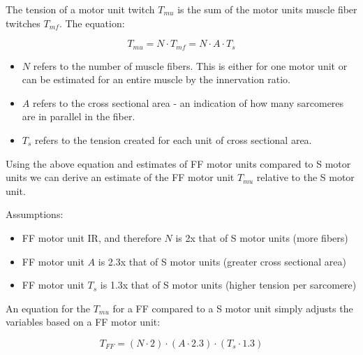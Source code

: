\vspace{0.2cm}

The tension of a motor unit twitch $T_{mu}$ is the sum of the motor units muscle fiber twitches $T_{mf}$. The equation:

\begin{equation}
    T_{mu} = N \cdot T_{mf} = N \cdot A \cdot T_s
\end{equation}

\begin{itemize}
    \item $N$ refers to the number of muscle fibers. This is either for one motor unit or can be estimated for an entire muscle by the innervation ratio.\footnotemark{}
    \item $A$ refers to the cross sectional area - an indication of how many sarcomeres are in parallel in the fiber.
    \item $T_s$ refers to the tension created for each unit of cross sectional area.
\end{itemize}

Using the above equation and estimates of FF motor units compared to S motor units we can derive an estimate of the FF motor unit $T_{mu}$ relative to the S motor unit. 

\vspace{0.2cm}
Assumptions:
\begin{itemize}
    \item FF motor unit IR, and therefore $N$ is 2x that of S motor units (more fibers)
    \item FF motor unit $A$ is 2.3x that of S motor units (greater cross sectional area)
    \item FF motor unit $T_s$ is 1.3x that of S motor units (higher tension per sarcomere)
\end{itemize}

An equation for the $T_{mu}$ for a FF compared to a S motor unit simply adjusts the variables based on a FF motor unit:

\begin{equation}
    T_{FF} = (N \cdot 2) \cdot (A \cdot 2.3) \cdot (T_s \cdot 1.3)
\end{equation}

